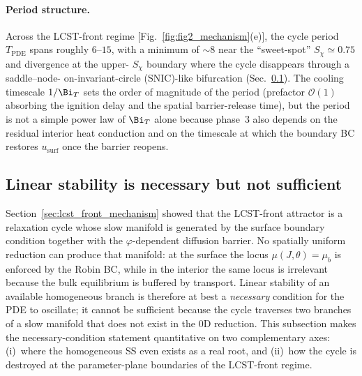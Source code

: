 \paragraph{Period structure.}  Across the LCST-front regime
[Fig.~\ref{fig:fig2_mechanism}(e)], the cycle period $T_\mathrm{PDE}$
spans roughly $6$--$15$, with a minimum of $\sim\!8$ near the
``sweet-spot'' $S_\chi\!\simeq\!0.75$ and divergence at the upper-
$S_\chi$ boundary where the cycle disappears through a saddle--node-
on-invariant-circle (SNIC)-like bifurcation
(Sec.~\ref{sec:lsa_vs_nl}).  The cooling timescale $1/\Bi_T$ sets the
order of magnitude of the period (prefactor $\mathcal{O}(1)$
absorbing the ignition delay and the spatial barrier-release time),
but the period is not a simple power law of $\Bi_T$ alone because
phase~3 also depends on the residual interior heat conduction and on
the timescale at which the boundary BC restores
$u_\mathrm{surf}$ once the barrier reopens.

\subsection{Linear stability is necessary but not sufficient}
\label{sec:lsa_vs_nl}

Section~\ref{sec:lcst_front_mechanism} showed that the LCST-front
attractor is a relaxation cycle whose slow manifold is generated by
the surface boundary condition together with the
$\varphi$-dependent diffusion barrier.  No spatially uniform reduction
can produce that manifold: at the surface the locus
$\mu(J,\theta)=\mu_b$ is enforced by the Robin BC, while in the
interior the same locus is irrelevant because the bulk equilibrium is
buffered by transport.  Linear stability of an available homogeneous
branch is therefore at best a \emph{necessary} condition for the PDE
to oscillate; it cannot be sufficient because the cycle traverses
two branches of a slow manifold that does not exist in the 0D
reduction.  This subsection makes the necessary-condition statement
quantitative on two complementary axes: (i)~where the homogeneous SS
even exists as a real root, and (ii)~how the cycle is destroyed at
the parameter-plane boundaries of the LCST-front regime.

